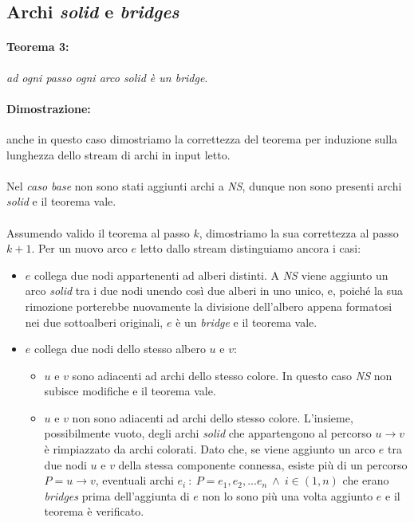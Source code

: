 \documentclass[a4paper,11pt]{report}
\begin{document}
\subsection{Archi \emph{solid} e \emph{bridges}}\label{Archi solid e bridges}
\paragraph{Teorema 3:}\emph{ ad ogni passo ogni arco \emph{solid} è un \emph{bridge}}.
\paragraph{Dimostrazione:} anche in questo caso dimostriamo la correttezza del teorema per induzione sulla lunghezza dello stream di archi
in input letto.
\paragraph{}
Nel \emph{caso base} non sono stati aggiunti archi a \emph{NS}, dunque non sono presenti archi \emph{solid} e il teorema vale.
\paragraph{}
Assumendo valido il teorema al passo $k$, dimostriamo la sua correttezza al passo $k+1$.
Per un nuovo arco $e$ letto dallo stream distinguiamo ancora i casi:
\begin{itemize}
 \item $e$ collega due nodi appartenenti ad alberi distinti. A \emph{NS} viene aggiunto un arco \emph{solid} tra i due nodi unendo così due
alberi in uno unico, e, poiché la sua rimozione
porterebbe nuovamente la divisione dell'albero appena formatosi nei due sottoalberi originali, $e$ è un \emph{bridge} e il teorema vale.
 \item $e$ collega due nodi dello stesso albero $u$ e $v$: 
 \begin{itemize}
  \item $u$ e $v$ sono adiacenti ad archi dello stesso colore. In questo caso \emph{NS} non subisce modifiche e il teorema vale.
  \item $u$ e $v$ non sono adiacenti ad archi dello stesso colore. L'insieme, possibilmente vuoto, degli archi \emph{solid} che appartengono
al percorso \mbox{$u \rightarrow v$}
è rimpiazzato da archi colorati. Dato che, se viene aggiunto un arco $e$ tra due nodi $u$ e $v$ della stessa componente connessa, esiste più
di un percorso $P=u \rightarrow v$, eventuali archi
$e_i\ :\ P=e_1,e_2,...e_n\ \wedge\ i\in(1,n)$ che erano \emph{bridges} prima dell'aggiunta di $e$ non lo sono più una volta aggiunto $e$ e
il teorema è verificato.
 \end{itemize}
\end{itemize}
\end{document}
